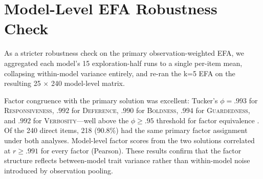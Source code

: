 \documentclass[11pt]{article}
\newcommand{\factorname}[1]{\textsc{#1}}
\begin{document}

\FloatBarrier
\section{Model-Level EFA Robustness Check}
\label{app:ml-efa}

As a stricter robustness check on the primary observation-weighted EFA, we aggregated each model's 15 exploration-half runs to a single per-item mean, collapsing within-model variance entirely, and re-ran the k=5 EFA on the resulting 25 $\times$ 240 model-level matrix.

Factor congruence with the primary solution was excellent: Tucker's $\phi = .993$ for \factorname{Responsiveness}, $.992$ for \factorname{Deference}, $.990$ for \factorname{Boldness}, $.994$ for \factorname{Guardedness}, and $.992$ for \factorname{Verbosity}---well above the $\phi \geq .95$ threshold for factor equivalence \citep{lorenzo2006tuckers}.
Of the 240 direct items, 218 (90.8\%) had the same primary factor assignment under both analyses.
Model-level factor scores from the two solutions correlated at $r \geq .991$ for every factor (Pearson).
These results confirm that the factor structure reflects between-model trait variance rather than within-model noise introduced by observation pooling.
\end{document}

